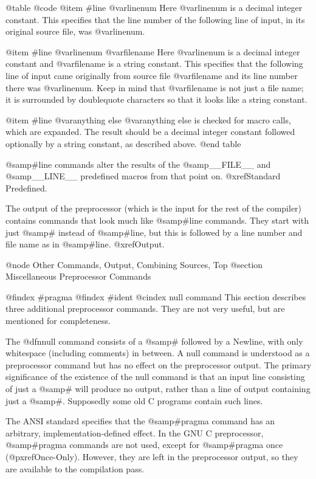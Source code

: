 {{@table @code
@item #line @var{linenum}
Here @var{linenum} is a decimal integer constant.  This specifies that
the line number of the following line of input, in its original source file,
was @var{linenum}.

@item #line @var{linenum} @var{filename}
Here @var{linenum} is a decimal integer constant and @var{filename}
is a string constant.  This specifies that the following line of input
came originally from source file @var{filename} and its line number there
was @var{linenum}.  Keep in mind that @var{filename} is not just a
file name; it is surrounded by doublequote characters so that it looks
like a string constant.

@item #line @var{anything else}
@var{anything else} is checked for macro calls, which are expanded.
The result should be a decimal integer constant followed optionally
by a string constant, as described above.
@end table

@samp{#line} commands alter the results of the @samp{__FILE__} and
@samp{__LINE__} predefined macros from that point on.  @xref{Standard
Predefined}.

The output of the preprocessor (which is the input for the rest of the
compiler) contains commands that look much like @samp{#line} commands.
They start with just @samp{#} instead of @samp{#line}, but this is
followed by a line number and file name as in @samp{#line}.  @xref{Output}.

@node Other Commands, Output, Combining Sources, Top
@section Miscellaneous Preprocessor Commands

@findex #pragma
@findex #ident
@cindex null command
This section describes three additional preprocessor commands.  They are
not very useful, but are mentioned for completeness.

The @dfn{null command} consists of a @samp{#} followed by a Newline, with
only whitespace (including comments) in between.  A null command is
understood as a preprocessor command but has no effect on the preprocessor
output.  The primary significance of the existence of the null command is
that an input line consisting of just a @samp{#} will produce no output,
rather than a line of output containing just a @samp{#}.  Supposedly
some old C programs contain such lines.

The ANSI standard specifies that the @samp{#pragma} command has an
arbitrary, implementation-defined effect.  In the GNU C preprocessor,
@samp{#pragma} commands are not used, except for @samp{#pragma once}
(@pxref{Once-Only}).  However, they are left in the preprocessor output,
so they are available to the compilation pass.

}}
